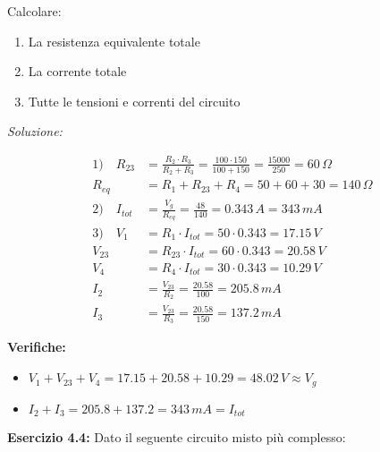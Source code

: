 \documentclass[a4paper,12pt]{article}
\begin{document}
Calcolare:
\begin{enumerate}
    \item La resistenza equivalente totale
    \item La corrente totale
    \item Tutte le tensioni e correnti del circuito
\end{enumerate}

\textit{Soluzione:}

\begin{align*}
1)\quad R_{23} &= \frac{R_2 \cdot R_3}{R_2 + R_3} = \frac{100 \cdot 150}{100 + 150} = \frac{15000}{250} = 60\,\Omega \\
R_{eq} &= R_1 + R_{23} + R_4 = 50 + 60 + 30 = 140\,\Omega \\
2)\quad I_{tot} &= \frac{V_g}{R_{eq}} = \frac{48}{140} = 0.343\,A = 343\,mA \\
3)\quad V_1 &= R_1 \cdot I_{tot} = 50 \cdot 0.343 = 17.15\,V \\
V_{23} &= R_{23} \cdot I_{tot} = 60 \cdot 0.343 = 20.58\,V \\
V_4 &= R_4 \cdot I_{tot} = 30 \cdot 0.343 = 10.29\,V \\
I_2 &= \frac{V_{23}}{R_2} = \frac{20.58}{100} = 205.8\,mA \\
I_3 &= \frac{V_{23}}{R_3} = \frac{20.58}{150} = 137.2\,mA
\end{align*}

\textbf{Verifiche:}
\begin{itemize}
    \item $V_1 + V_{23} + V_4 = 17.15 + 20.58 + 10.29 = 48.02\,V \approx V_g$ \checkmark
    \item $I_2 + I_3 = 205.8 + 137.2 = 343\,mA = I_{tot}$ \checkmark
\end{itemize}


\textbf{Esercizio 4.4:} Dato il seguente circuito misto più complesso: 
\end{document}
